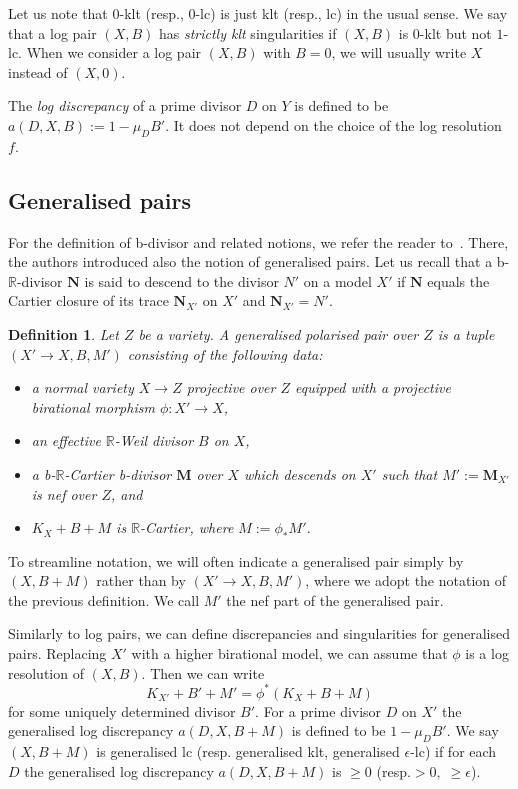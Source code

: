 \documentclass[11pt]{ip-journal}
\newtheorem{definition}[theorem]{Definition}
\theoremstyle{definition}
\newcommand{\bR}{\mathbb{R}}
\begin{document}
Let us note that $0$-klt (resp., $0$-lc) is just klt (resp., lc) in the usual sense. 
We say that a log pair $(X, B)$ has {\it strictly klt} singularities if $(X, B)$ is $0$-klt but not $1$-lc.
When we consider a log pair $(X, B)$ with $B=0$, we will usually write $X$ instead of $(X,0)$.

 
The {\it log discrepancy} of a prime divisor $D$ on $Y$ is defined to be $a(D, X, B):=1-\mu_D B'$.
It does not depend on the choice of the log resolution $f$.

\subsection{Generalised pairs}
\label{gen.pair.sect} 
For the definition of b-divisor and related notions, we refer the reader to~\cite{bir-zh}.
There, the authors introduced also the notion of generalised pairs. 
Let us recall that a b-$\mathbb{R}$-divisor $\mathbf{N}$ is said to descend to the divisor $N'$ on a model $X'$ if $\mathbf{N}$ equals the Cartier closure of its trace $\mathbf{N}_{X'}$ on $X'$ and $\mathbf{N}_{X'}=N'$.
\begin{definition}
Let $Z$ be a variety. 
A generalised polarised pair over $Z$ is a tuple $(X' \to X, B, M')$ consisting of the following data:
\begin{itemize}
\item a normal variety $X \to Z$ projective over $Z$ equipped with a projective birational morphism $\phi:X' \rightarrow X$, 
\item an effective $\bR$-Weil divisor $B$ on $X$,
\item a b-$\bR$-Cartier b-divisor $\mathbf{M}$ over $X$ which descends on $X'$ such that $M':=\mathbf{M}_{X'}$ is nef over $Z$, and
\item $K_X +B+ M$ is $\bR$-Cartier, where $M := \phi_\ast M'$.
\end{itemize}
\end{definition}

To streamline notation, we will often indicate a generalised pair simply by 
$(X, B+M)$
rather than by 
$(X' \rightarrow X, B, M')$, 
where we adopt the notation of the previous definition.
We call $M'$ the nef part of the generalised pair.

Similarly to log pairs, we can define discrepancies and singularities for generalised pairs. 
Replacing $X'$ with a higher birational model, we can assume that $\phi$ is a log resolution of $(X, B)$. 
Then we can write 
\[
K_{X'} + B'+M'=\phi^*(K_X+B+M)
\]
for some uniquely determined divisor $B'$. 
For a prime divisor $D$ on $X'$ the generalised log discrepancy $a(D,X,B + M)$ is defined to be $1-\mu_D B'$.
We say $(X, B+M)$ is generalised lc (resp. generalised klt, generalised $\epsilon$-lc) if for each $D$ the generalised log discrepancy $a(D,X,B+M)$ is $\geq0$ (resp.$> 0, \; \geq \epsilon$).
\end{document}
